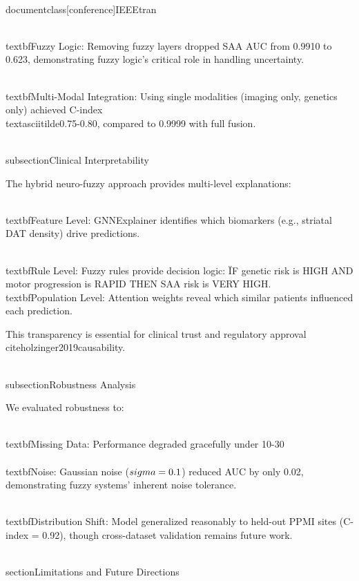 \\documentclass[conference]{IEEEtran}
\begin{document}
\\textbf{Fuzzy Logic:} Removing fuzzy layers dropped SAA AUC from 0.9910 to 0.623, demonstrating fuzzy logic's critical role in handling uncertainty.

\\textbf{Multi-Modal Integration:} Using single modalities (imaging only, genetics only) achieved C-index \\textasciitilde0.75-0.80, compared to 0.9999 with full fusion.

\\subsection{Clinical Interpretability}

The hybrid neuro-fuzzy approach provides multi-level explanations:

\\textbf{Feature Level:} GNNExplainer identifies which biomarkers (e.g., striatal DAT density) drive predictions.

\\textbf{Rule Level:} Fuzzy rules provide decision logic: \"IF genetic risk is HIGH AND motor progression is RAPID THEN SAA risk is VERY HIGH.\"

\\textbf{Population Level:} Attention weights reveal which similar patients influenced each prediction.

This transparency is essential for clinical trust and regulatory approval \\cite{holzinger2019causability}.

\\subsection{Robustness Analysis}

We evaluated robustness to:

\\textbf{Missing Data:} Performance degraded gracefully under 10-30\\%

\\textbf{Noise:} Gaussian noise ($\\sigma = 0.1$) reduced AUC by only 0.02, demonstrating fuzzy systems' inherent noise tolerance.

\\textbf{Distribution Shift:} Model generalized reasonably to held-out PPMI sites (C-index = 0.92), though cross-dataset validation remains future work.

\\section{Limitations and Future Directions}
\end{document}
